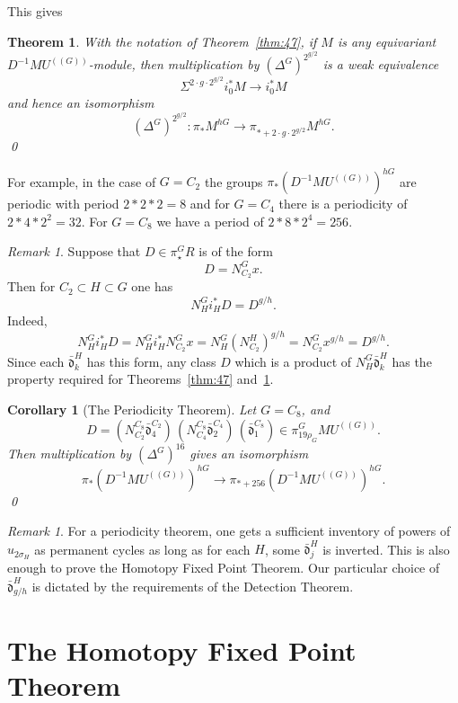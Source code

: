\documentclass{amsart}
\newtheorem{thm}[equation]{Theorem}
\newtheorem{cor}[equation]{Corollary}
\newtheorem{rem}[equation]{Remark}
\theoremstyle{definition}
\theoremstyle{remark}
\newtheorem{rem}[equation]{Remark}
\newcommand{\mutn}[1]{MU^{(\!(#1)\!)}}
\newcommand{\norm}{N}
\newcommand{\gbar}{\bar}
\newcommand{\normrbar}{\gbar{\mathfrak d}}
\newcommand{\normr}{\Delta}
\newcommand{\zt}{C_{2}}
\newcommand{\ze}{C_{8}}
\newcommand{\zf}{C_{4}}
\newcommand{\D}{D} %
\begin{document}
This gives 

\begin{thm}
\label{thm:51} With the notation of Theorem~\ref{thm:47}, if $M$
is any equivariant $\D^{-1}\mutn{G}$-module, then multiplication by
$(\normr^{G})^{2^{g/2}}$ is a weak equivalence
\[
\Sigma^{2\cdot g\cdot 2^{g/2}}i_{0}^{\ast}M\to i_{0}^{\ast}M
\]
and hence an isomorphism
\[
(\normr^{G})^{2^{g/2}}:\pi_{\ast}M^{hG}\to \pi_{\ast+2\cdot g\cdot
2^{g/2}}M^{hG}.
\]
\qed
\end{thm}

For example, in the case of $G=\zt$ the groups
$\pi_{\ast}(D^{-1}\mutn{G})^{hG}$ are periodic with period $2*2*2=8$
and for $G=\zf$ there is a periodicity of $2*4*2^{2}=32$.  For $G=\ze$
we have a period of $2*8*2^{4}=256$.

\begin{rem}
\label{rem:46}
Suppose that $D\in\pi^{G}_{\star}R$ is of the form
\[
D=\norm_{\zt}^{G}x.   
\]
Then for $\zt\subset H\subset G$ one has
\[
\norm_{H}^{G}i_{H}^{\ast}D = D^{g/h}.
\]
Indeed,
\[
\norm_{H}^{G}i_{H}^{\ast}D = 
\norm_{H}^{G}i_{H}^{\ast}\norm_{\zt}^{G}x = 
\norm_{H}^{G}(\norm_{\zt}^{H})^{g/h}= \norm_{\zt}^{G}x^{g/h} = D^{g/h}.
\]
Since each $\normrbar_{k}^{H}$ has this form, any class $D$ which is a
product of $\norm_{H}^{G}\normrbar_{k}^{H}$ has the property required
for Theorems~\ref{thm:47} and~\ref{thm:51}.
\end{rem}


\begin{cor}[The Periodicity Theorem]
\label{thm:140}
Let $G=\ze$, and
\[
\D=(\norm_{\zt}^{\ze}\normrbar_{4}^{\zt})\,
(\norm_{\zf}^{\ze}\normrbar_{2}^{\zf}) \,
(\normrbar_{1}^{\ze}) \in \pi^{G}_{19\rho_{G}}\mutn{G}.
\]
Then multiplication by $(\normr^{G})^{16}$ gives an isomorphism
\[
\pi_{\ast}(\D^{-1}\mutn{G})^{hG}\to
\pi_{\ast+256}(\D^{-1}\mutn{G})^{hG}.
\]
\qed
\end{cor}

\begin{rem}
\label{rem:45} 
For a periodicity theorem, one gets a sufficient
inventory of powers of $u_{2\sigma_{H}}$ as permanent cycles as long
as for each $H$, some $\normrbar^{H}_{j}$ is inverted.  This is also
enough to prove the Homotopy Fixed Point Theorem.  Our particular
choice of $\normrbar^{H}_{g/h}$ is dictated by the requirements of the
Detection Theorem.
\end{rem}

\section{The Homotopy Fixed Point Theorem}
\label{sec:fixed-points-homot}
\end{document}
